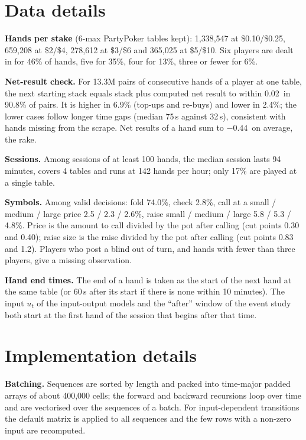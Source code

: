 \appendix
\section{Data details}
\label{app:data}
\textbf{Hands per stake} (6-max PartyPoker tables kept): 1{,}338{,}547 at \$0.10/\$0.25, 659{,}208 at \$2/\$4, 278{,}612 at \$3/\$6 and 365{,}025 at \$5/\$10. Six players are dealt in for 46\% of hands, five for 35\%, four for 13\%, three or fewer for 6\%.

\textbf{Net-result check.} For 13.3M pairs of consecutive hands of a player at one table, the next starting stack equals stack plus computed net result to within 0.02\bb\ in 90.8\% of pairs. It is higher in 6.9\% (top-ups and re-buys) and lower in 2.4\%; the lower cases follow longer time gaps (median 75\,s against 32\,s), consistent with hands missing from the scrape. Net results of a hand sum to $-0.44$\bb\ on average, the rake.

\textbf{Sessions.} Among sessions of at least 100 hands, the median session lasts 94 minutes, covers 4 tables and runs at 142 hands per hour; only 17\% are played at a single table.

\textbf{Symbols.} Among valid decisions: fold 74.0\%, check 2.8\%, call at a small / medium / large price 2.5 / 2.3 / 2.6\%, raise small / medium / large 5.8 / 5.3 / 4.8\%. Price is the amount to call divided by the pot after calling (cut points 0.30 and 0.40); raise size is the raise divided by the pot after calling (cut points 0.83 and 1.2). Players who post a blind out of turn, and hands with fewer than three players, give a missing observation.

\textbf{Hand end times.} The end of a hand is taken as the start of the next hand at the same table (or 60\,s after its start if there is none within 10 minutes). The input $u_t$ of the input-output models and the ``after'' window of the event study both start at the first hand of the session that begins after that time.

\section{Implementation details}
\label{app:impl}
\textbf{Batching.} Sequences are sorted by length and packed into time-major padded arrays of about 400{,}000 cells; the forward and backward recursions loop over time and are vectorised over the sequences of a batch. For input-dependent transitions the default matrix is applied to all sequences and the few rows with a non-zero input are recomputed.

